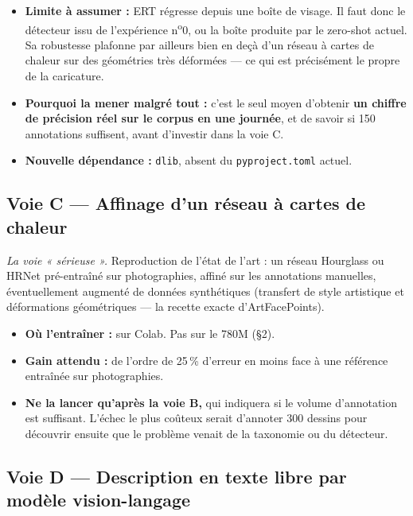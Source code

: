 \documentclass[11pt,a4paper]{article}
\newcommand{\alerte}[1]{\textcolor{alerte}{\textbf{#1}}}
\begin{document}
\begin{itemize}[leftmargin=*,itemsep=3pt]
  \item \alerte{Limite à assumer :} ERT régresse depuis une boîte de visage. Il
  faut donc le détecteur issu de l'expérience n\textsuperscript{o}0, ou la boîte
  produite par le zero-shot actuel. Sa robustesse plafonne par ailleurs bien en
  deçà d'un réseau à cartes de chaleur sur des géométries très déformées — ce qui
  est précisément le propre de la caricature.
  \item \textbf{Pourquoi la mener malgré tout :} c'est le seul moyen d'obtenir
  \textbf{un chiffre de précision réel sur le corpus en une journée}, et de savoir
  si 150 annotations suffisent, avant d'investir dans la voie C.
  \item \textbf{Nouvelle dépendance :} \texttt{dlib}, absent du
  \texttt{pyproject.toml} actuel.
\end{itemize}

\subsection{Voie C — Affinage d'un réseau à cartes de chaleur}

\emph{La voie « sérieuse ».} Reproduction de l'état de l'art : un réseau
Hourglass ou HRNet pré-entraîné sur photographies, affiné sur les annotations
manuelles, éventuellement augmenté de données synthétiques (transfert de style
artistique et déformations géométriques — la recette exacte d'ArtFacePoints).

\begin{itemize}[leftmargin=*,itemsep=3pt]
  \item \textbf{Où l'entraîner :} sur Colab. Pas sur le 780M (§2).
  \item \textbf{Gain attendu :} de l'ordre de 25\,\% d'erreur en moins face à une
  référence entraînée sur photographies.
  \item \alerte{Ne la lancer qu'après la voie B,} qui indiquera si le volume
  d'annotation est suffisant. L'échec le plus coûteux serait d'annoter
  300 dessins pour découvrir ensuite que le problème venait de la taxonomie ou du
  détecteur.
\end{itemize}

\subsection{Voie D — Description en texte libre par modèle vision-langage}
\end{document}
